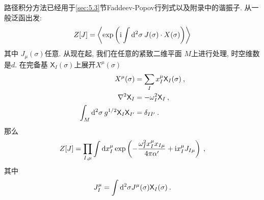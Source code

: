 路径积分方法已经用于\ref{sec:5.3}节Faddeev-Popov行列式以及附录中的谐振子. 从一般泛函出发: 
\begin{equation}
	Z[J]=\left\langle\exp \left(\mathrm{i} \int \mathrm{d}^{2} \sigma\: J(\sigma) \cdot X(\sigma)\right)\right\rangle \label{6.2.1}
\end{equation}
其中 $J_{\mu}(\sigma) $任意. 从现在起, 我们在任意的紧致二维平面 $M$上进行处理, 时空维数是$d$. 
在完备基 $\mathsf{X}_{I}(\sigma)$上展开$X^{\mu}(\sigma)$ 
\begin{subequations} \label{6.2.2}
\begin{align}
X^{\mu}(\sigma) &= \sum_{I} x_{I}^{\mu} \mathsf{X}_{I}(\sigma) \:, \label{6.2.2a} \\
\nabla^{2} \mathsf{X}_{I} &= -\omega_{I}^{2} \mathsf{X}_{I} \:,  \label{6.2.2b} \\
\int_{M} \mathrm{d}^{2} \sigma\: g^{1 / 2} \mathsf{X}_{I} \mathsf{X}_{I^{\prime}} &= \delta_{I I^{\prime}} \:.  \label{6.2.2c} 
\end{align}	
\end{subequations}
那么
\begin{equation}
	Z[J]=\prod_{I, \mu} \int \mathrm{d} x_{I}^{\mu} \exp \left(-\frac{\omega_{I}^{2} x_{I}^{\mu} x_{I \mu}}{4 \pi \alpha^{\prime}}+\mathrm{i} x_{I}^{\mu} J_{I \mu}\right) \:, \label{6.2.3}
\end{equation}
其中
\begin{equation}
	J_{I}^{\mu}=\int \mathrm{d}^{2} \sigma J^{\mu}(\sigma) \mathsf{X}_{I}(\sigma) \:. \label{6.2.4}
\end{equation}


